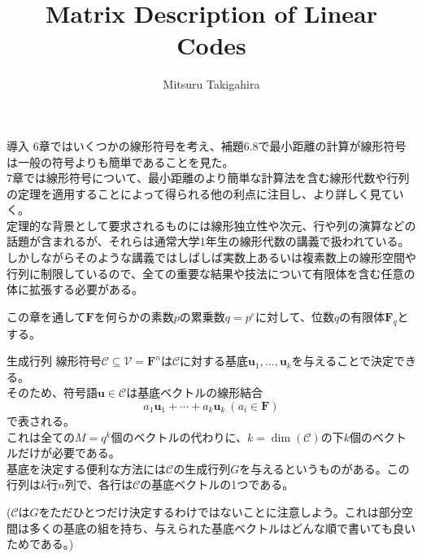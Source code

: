 \documentclass[dvipdfmx,10pt,jsarticle]{beamer}
\title{Matrix Description of Linear Codes}
\author{Mitsuru Takigahira}
\date[2017/10/20]{}
\begin{document}
  \frame{\maketitle}

  \begin{frame}{導入}
    6章ではいくつかの線形符号を考え、補題6.8で最小距離の計算が線形符号は一般の符号よりも簡単であることを見た。 \\
    7章では線形符号について、最小距離のより簡単な計算法を含む線形代数や行列の定理を適用することによって得られる他の利点に注目し、より詳しく見ていく。 \\
    定理的な背景として要求されるものには線形独立性や次元、行や列の演算などの話題が含まれるが、それらは通常大学1年生の線形代数の講義で扱われている。\\
    しかしながらそのような講義ではしばしば実数上あるいは複素数上の線形空間や行列に制限しているので、全ての重要な結果や技法について有限体を含む任意の体に拡張する必要がある。
    
    この章を通して$\mathbf{F}$を何らかの素数$p$の累乗数$q = p^e$に対して、位数$q$の有限体$\mathbf{F}_q$とする。
  \end{frame}
  \begin{frame}{生成行列}
    線形符号$\mathcal{C} \subseteq \mathcal{V} = \mathbf{F}^n$は$\mathcal{C}$に対する基底$\mathbf{u}_1, \ldots, \mathbf{u}_k$を与えることで決定できる。\\ そのため、符号語$\mathbf{u} \in \mathcal{C}$は基底ベクトルの線形結合 \[ a_1 \mathbf{u}_1 + \cdots + a_k \mathbf{u}_k \ (a_i \in \mathbf{F}) \]
    で表される。 \\
    これは全ての$M = q^k$個のベクトルの代わりに、$k = \dim (\mathcal{C})$の下$k$個のベクトルだけが必要である。\\
    基底を決定する便利な方法には$\mathcal{C}$の生成行列$G$を与えるというものがある。この行列は$k$行$n$列で、各行は$\mathcal{C}$の基底ベクトルの1つである。 

    ($\mathcal{C}$は$G$をただひとつだけ決定するわけではないことに注意しよう。これは部分空間は多くの基底の組を持ち、与えられた基底ベクトルはどんな順で書いても良いためである。)
  \end{frame}
\end{document}
